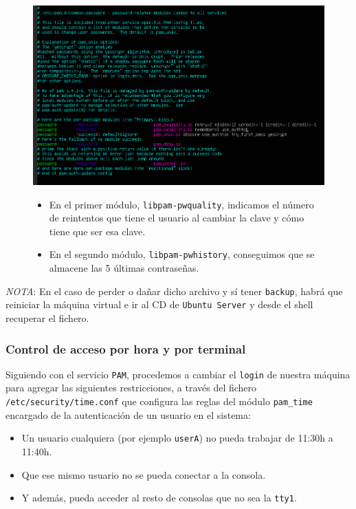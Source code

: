 \documentclass[10pt]{article}
\begin{document}
	\begin{figure}[H]
		\centering
		\begin{minipage}{0.6\textwidth}
			\centering
			\includegraphics[width=\linewidth]{Recursos/common-password.png}
		\end{minipage}\hfill
		\begin{minipage}{0.35\textwidth}
			\begin{itemize}
				\item En el primer módulo, \verb|libpam-pwquality|, indicamos el número de reintentos que tiene el usuario al cambiar la clave y cómo tiene que ser esa clave.
				\item En el segundo módulo, \verb|libpam-pwhistory|, conseguimos que se almacene las 5 últimas contraseñas.
			\end{itemize}
		\end{minipage}
	\end{figure}
	
	\textit{NOTA}: En el caso de perder o dañar dicho archivo y sí tener \verb|backup|, habrá que reiniciar la máquina virtual e ir al CD de \verb|Ubuntu Server| y desde el shell recuperar el fichero.
	
	\clearpage
	
	\subsubsection{Control de acceso por hora y por terminal}
	Siguiendo con el servicio \verb|PAM|, procedemos a cambiar el \verb|login| de nuestra máquina para agregar las siguientes restricciones, a través del fichero \verb|/etc/security/time.conf| que configura las reglas del módulo \verb|pam_time| encargado de la autenticación de un usuario en el sistema:
	\begin{itemize}
		\item Un usuario cualquiera (por ejemplo \verb|userA|) no pueda trabajar de 11:30h a 11:40h.
		\item Que ese mismo usuario no se pueda conectar a la consola.
		\item Y además, pueda acceder al resto de consolas que no sea la \verb|tty1|.
	\end{itemize}
	
\end{document}
